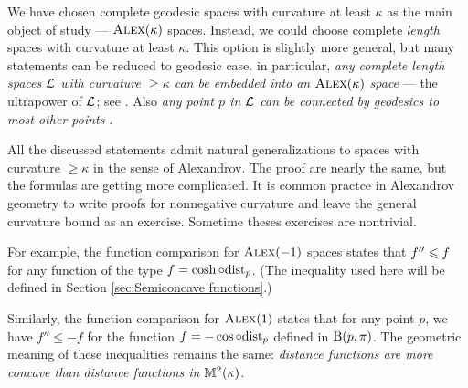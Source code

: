 We have chosen complete geodesic spaces with curvature at least $\kappa$ as the main object of study --- $\textsc{Alex}(\kappa)$ spaces.
Instead, we could choose complete \textit{length} spaces with curvature at least $\kappa$.
This option is slightly more general, but many statements can be reduced to geodesic case.
in particular, \textit{any complete length spaces $\mathcal{L}$ with curvature $\ge \kappa$
can be embedded into an $\textsc{Alex}(\kappa)$ space} --- the ultrapower of $\mathcal{L}$; see \cite[4.11+8.4]{alexander-kapovitch-petrunin2024}.
Also \textit{any point $p$ in $\mathcal{L}$ can be connected by geodesics to most other points} 
\cite[8.11]{alexander-kapovitch-petrunin2024}.

All the discussed statements admit natural generalizations to 
spaces with curvature $\ge \kappa$ in the sense of Alexandrov.
The proof are nearly the same, but the formulas are getting more complicated.
It is common practce in Alexandrov geometry to write proofs for nonnegative curvature and 
leave the general curvature bound as an exercise.
Sometime theses exercises are nontrivial. 

For example, the function comparison for $\textsc{Alex}(-1)$ spaces states that 
$f''\z\le f$ for any function of the type $f=\cosh\circ\mathrm{dist}_p$.
(The inequality used here will be defined in Section \ref{sec:Semiconcave functions}.)

Similarly, the function comparison for $\textsc{Alex}(1)$ states that for any point $p$, we have
$f''\le -f$ for the function $f=-\cos\circ\mathrm{dist}_p$
defined in $\mathrm{B}{}(p,\pi)$.
The geometric meaning of these inequalities remains the same:
\textit{distance functions are more concave than distance functions in $\mathbb{M}^2(\kappa)$}.

